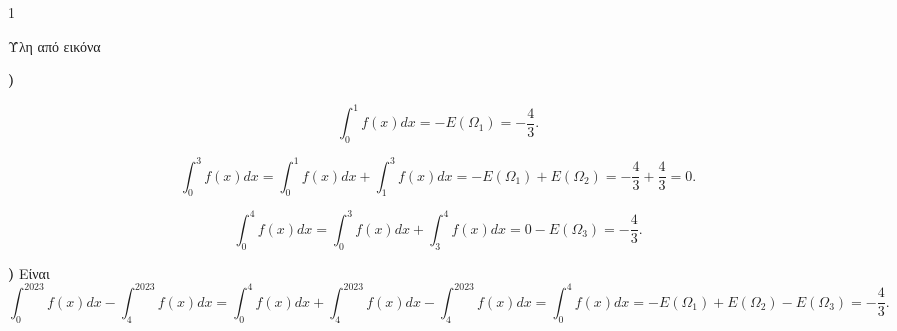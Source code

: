 \begin{ylh}{1}
    \item [Ύλη από εικόνα]
\end{ylh}
\begin{alist}
\item[\textbf{\alpha)}]
    \begin{rlist}
        \item[\text{i.}] \[ \int_0^1 f(x)dx = -E(\Omega_1) = -\frac{4}{3}. \]
        \item[\text{ii.}] \[ \int_0^3 f(x)dx = \int_0^1 f(x)dx + \int_1^3 f(x)dx = -E(\Omega_1) + E(\Omega_2) = -\frac{4}{3} + \frac{4}{3} = 0. \]
        \item[\text{iii.}] \[ \int_0^4 f(x)dx = \int_0^3 f(x)dx + \int_3^4 f(x)dx = 0 - E(\Omega_3) = -\frac{4}{3}. \]
    \end{rlist}
\item[\textbf{\beta)}] Είναι
    \[ \int_0^{2023} f(x)dx - \int_4^{2023} f(x)dx = \int_0^4 f(x)dx + \int_4^{2023} f(x)dx - \int_4^{2023} f(x)dx = \int_0^4 f(x)dx = -E(\Omega_1) + E(\Omega_2) - E(\Omega_3) = -\frac{4}{3}. \]
\end{alist}